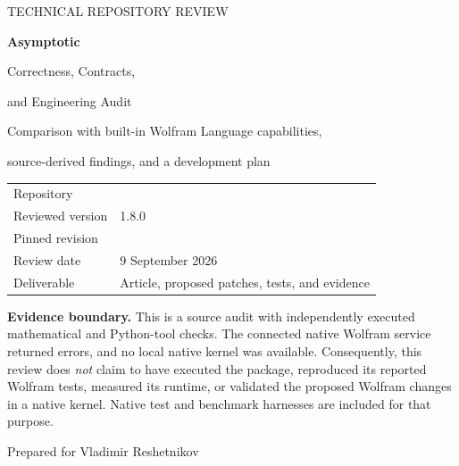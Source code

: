 \documentclass[11pt,a4paper]{article}
\newcommand{\code}[1]{\texttt{\detokenize{#1}}}
\newcommand{\SHA}{\code{07a9781212beb2eeb9ff16aa625b50ac27974078}}
\begin{document}
\begin{titlepage}
\thispagestyle{empty}
\vspace*{16mm}
{\sffamily\large\color{accent} TECHNICAL REPOSITORY REVIEW}\par
\vspace{9mm}
{\sffamily\bfseries\Huge Asymptotic}\par
\vspace{4mm}
{\sffamily\LARGE Correctness, Contracts,\par and Engineering Audit}\par
\vspace{9mm}
{\large Comparison with built-in Wolfram Language capabilities,\par source-derived findings, and a development plan}\par
\vspace{16mm}
\begin{tabular}{@{}ll@{}}
Repository & \code{VladimirReshetnikov/Asymptotic}\\
Reviewed version & 1.8.0\\
Pinned revision & \SHA\\
Review date & 9 September 2026\\
Deliverable & Article, proposed patches, tests, and evidence\\
\end{tabular}
\vfill
\begin{minipage}{0.94\linewidth}
\textbf{Evidence boundary.} This is a source audit with independently executed
mathematical and Python-tool checks. The connected native Wolfram service
returned errors, and no local native kernel was available. Consequently,
this review does \emph{not} claim to have executed the package, reproduced
its reported Wolfram tests, measured its runtime, or validated the proposed
Wolfram changes in a native kernel. Native test and benchmark harnesses are
included for that purpose.
\end{minipage}
\vspace{10mm}\par
{\sffamily Prepared for Vladimir Reshetnikov}
\end{titlepage}
\end{document}
